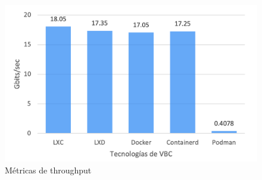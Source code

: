 \begin{figure}[H]
    \centering
    \includegraphics[scale=0.5] {tablas-images/cp4/THROUGHTPUT.png}
    \caption{Métricas de throughput}\label{fig:tabla-metricas-throughput}
\end{figure}